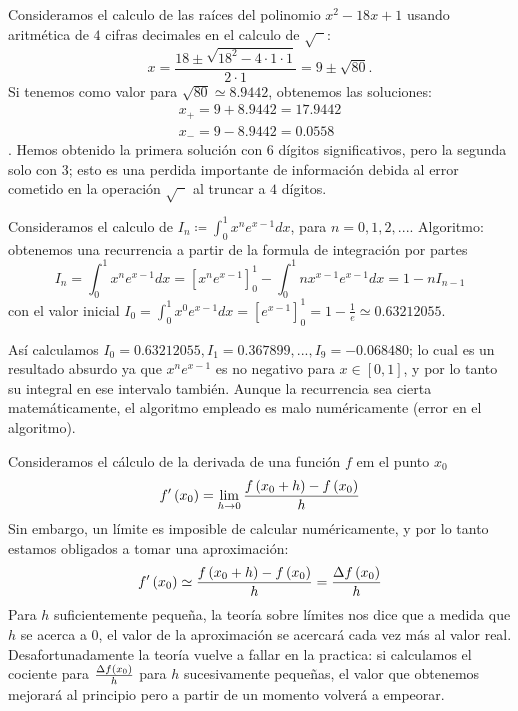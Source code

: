 \begin{example}\label{ej:2_errores}
    Consideramos el calculo de las raíces del polinomio $x^2 - 18x +1$ usando aritmética de $4$ cifras decimales en el calculo de $\sqrt{\phantom{x}}$:
    \[
            x = \dfrac{18 \pm \sqrt{18^2 - 4 \cdot 1 \cdot 1}}{2 \cdot 1} = 9 \pm \sqrt{80} \nonumber.
    \]
    Si tenemos como valor para $\sqrt{80} \simeq 8.9442$, obtenemos las soluciones:
    \begin{gather*}
            x_{+}=9+8.9442=17.9442 \\
            x_{-}=9-8.9442=0.0558
    \end{gather*}.
    Hemos obtenido la primera solución con $6$ dígitos significativos, pero la segunda solo con $3$; esto es una perdida importante de información debida al error cometido en la operación $\sqrt{\phantom{x}}$ al truncar a $4$ dígitos.
\end{example}

\begin{example}\label{ej:3_errores}
    Consideramos el calculo de $I_n \coloneqq \int_{0}^{1}x^ne^{x-1}dx$, para $n = 0,1,2,...$.
    Algoritmo: obtenemos una recurrencia a partir de la formula de integración por partes
    \[
            I_n = \int_{0}^{1}x^ne^{x-1}dx = [x^ne^{x-1}]_{0}^{1} - \int_{0}^{1}nx^{x-1}e^{x-1}dx = 1 - nI_{n-1} \nonumber
    \]
    con el valor inicial $I_0 = \int_{0}^{1}x^0e^{x-1}dx = [e^{x-1}]_{0}^{1} = 1 - \frac{1}{e} \simeq 0.63212055$.
    
    Así calculamos $I_0 = 0.63212055, I_1 = 0.367899, ..., I_9 = -0.068480$; lo cual es un resultado absurdo ya que $x^ne^{x-1}$ es no negativo para $x \in [0,1]$, y por lo tanto su integral en ese intervalo también. Aunque la recurrencia sea cierta matemáticamente, el algoritmo empleado es malo numéricamente (error en el algoritmo).
\end{example}

\begin{example}\label{ej:4_errores}
    Consideramos el cálculo de la derivada de una función $f$ em el punto $x_0$
    \[
            f'\left( x_0\right)  = \lim\limits_{h \rightarrow 0} \dfrac{f\left( x_0 + h\right)  - f\left( x_0\right) }{h} \nonumber
    \]
    Sin embargo, un límite es imposible de calcular numéricamente, y por lo tanto estamos obligados a tomar una aproximación:
    \[
            f'\left( x_0\right)  \simeq \dfrac{f\left( x_0 + h\right)  - f\left( x_0\right) }{h} = \frac{\Delta f\left( x_0\right) }{h} \nonumber
    \]
    Para $h$ suficientemente pequeña, la teoría sobre límites nos dice que a medida que $h$ se acerca a $0$, el valor de la aproximación se acercará cada vez más al valor real. Desafortunadamente la teoría vuelve a fallar en la practica: si calculamos el cociente para $\frac{\Delta f\left( x_0\right) }{h}$ para $h$ sucesivamente pequeñas, el valor que obtenemos mejorará al principio pero a partir de un momento volverá a empeorar. 
\end{example}
    
